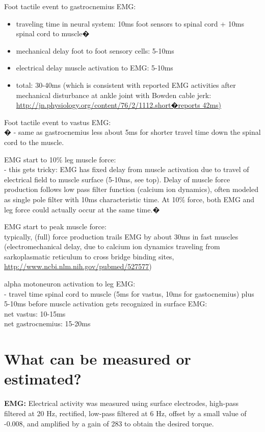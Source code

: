 \documentclass[letterpaper,12pt,fullpage]{article}
\begin{document}
Foot tactile event to gastrocnemius EMG:
\begin{itemize}
\item
traveling time in neural system: 10ms foot sensors to spinal cord +
10ms spinal cord to muscle�
\item
mechanical delay foot to foot sensory cells: 5-10ms
\item
electrical delay muscle activation to EMG: 5-10ms
\item
total: 30-40ms (which is consistent with reported EMG activities
after mechanical disturbance at ankle joint with Bowden cable jerk:
\url{http://jn.physiology.org/content/76/2/1112.short�reports 42ms)}
\end{itemize}

Foot tactile event to vastus EMG:\\�
- same as gastrocnemius less about 5ms for shorter travel time down
the spinal cord to the muscle.

EMG start to 10\% leg muscle force:\\
- this gets tricky: EMG has fixed delay from muscle activation due to
travel of electrical field to muscle surface (5-10ms, see top). Delay
of muscle force production follows low pass filter function (calcium
ion dynamics), often modeled as single pole filter with 10ms
characteristic time. At 10\% force, both EMG and leg force could
actually occur at the same time.�

EMG start to peak muscle force:\\
typically, (full) force production trails EMG by about 30ms in fast
muscles (electromechanical delay, due to calcium ion dynamics
traveling from sarkoplasmatic reticulum to cross bridge binding
sites, \url{http://www.ncbi.nlm.nih.gov/pubmed/527577})

alpha motoneuron activation to leg EMG:\\
- travel time spinal cord to muscle (5ms for vastus, 10ms for
gastocnemius) plus 5-10ms before muscle activation gets recognized in
surface EMG:\\
net vastus: 10-15ms\\
net gastrocnemius: 15-20ms

\section{What can be measured or estimated?}

{\bf EMG:}
Electrical activity was measured using surface electrodes,
high-pass filtered at 20 Hz, rectified, low-pass filtered at 6 Hz,
offset by a small value of -0.008, and amplified by a gain of 283
to obtain the desired torque.~\cite{IEEE07139980}
\end{document}
